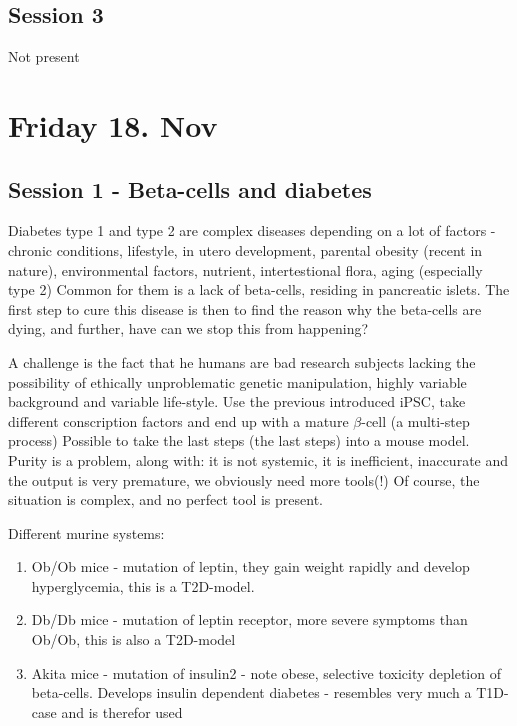 \documentclass[12p]{article}
\begin{document}
\subsection*{Session 3}

Not present

\section*{Friday 18. Nov}

\subsection*{Session 1 - Beta-cells and diabetes}

Diabetes type 1 and type 2 are complex diseases depending on a lot of factors - chronic conditions, lifestyle, in utero development, parental obesity (recent in nature), environmental factors, nutrient, intertestional flora, aging (especially type 2)
Common for them is a lack of beta-cells, residing in pancreatic islets.
The first step to cure this disease is then to find the reason why the beta-cells are dying, and further, have can we stop this from happening?

A challenge is the fact that he humans are bad research subjects lacking the possibility of ethically unproblematic genetic manipulation, highly variable background and variable life-style.
Use the previous introduced  iPSC, take different conscription factors and end up with a mature $\beta$-cell (a multi-step process)
Possible to take the last steps (the last steps) into a mouse model.
Purity is a problem, along with: it is not systemic, it is inefficient, inaccurate and the output is very premature, we obviously need more tools(!)
Of course, the situation is complex, and no perfect tool is present.

Different murine systems:

\begin{enumerate}
    \item
	Ob/Ob mice - mutation of leptin, they gain weight rapidly and develop hyperglycemia, this is a T2D-model.
   \item
	Db/Db mice - mutation of leptin receptor, more severe symptoms than Ob/Ob, this is also a T2D-model
    \item
	Akita mice - mutation of insulin2 - note obese, selective toxicity depletion of beta-cells. Develops insulin dependent diabetes - resembles very much a T1D-case and is therefor used 
\end{enumerate}
\end{document}
